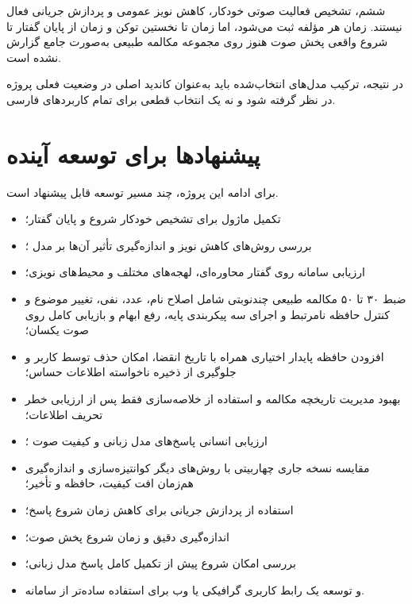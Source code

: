 ششم، تشخیص فعالیت صوتی خودکار، کاهش نویز عمومی و پردازش جریانی
فعال نیستند. زمان هر مؤلفه ثبت می‌شود، اما زمان تا نخستین توکن و
زمان از پایان گفتار تا شروع واقعی پخش صوت هنوز روی مجموعه مکالمه
طبیعی به‌صورت جامع گزارش نشده است.

در نتیجه، ترکیب مدل‌های انتخاب‌شده باید به‌عنوان کاندید
اصلی در وضعیت فعلی پروژه در نظر گرفته شود و نه یک انتخاب
قطعی برای تمام کاربردهای فارسی.


\section{پیشنهادها برای توسعه آینده}

برای ادامه این پروژه، چند مسیر توسعه قابل پیشنهاد است.

\begin{itemize}

    \item
    تکمیل ماژول
    برای تشخیص خودکار شروع و پایان گفتار؛

    \item
    بررسی روش‌های کاهش نویز و اندازه‌گیری تأثیر آن‌ها بر
    مدل ؛

    \item
    ارزیابی سامانه روی گفتار محاوره‌ای، لهجه‌های مختلف و
    محیط‌های نویزی؛

    \item
    ضبط ۳۰ تا ۵۰ مکالمه طبیعی چندنوبتی شامل اصلاح نام، عدد، نفی،
    تغییر موضوع و کنترل حافظه نامرتبط و اجرای سه پیکربندی پایه،
    رفع ابهام و بازیابی کامل روی صوت یکسان؛

    \item
    افزودن حافظه پایدار اختیاری همراه با تاریخ انقضا، امکان حذف
    توسط کاربر و جلوگیری از ذخیره ناخواسته اطلاعات حساس؛

    \item
    بهبود مدیریت تاریخچه مکالمه و استفاده از خلاصه‌سازی فقط پس
    از ارزیابی خطر تحریف اطلاعات؛

    \item
    ارزیابی انسانی پاسخ‌های مدل زبانی و کیفیت صوت ؛

    \item
    مقایسه نسخه جاری چهاربیتی با روش‌های دیگر کوانتیزه‌سازی و
    اندازه‌گیری هم‌زمان افت کیفیت، حافظه و تأخیر؛

    \item
    استفاده از پردازش جریانی برای کاهش زمان شروع پاسخ؛

    \item
    اندازه‌گیری دقیق
    و زمان شروع پخش صوت؛

    \item
    بررسی امکان شروع  پیش از تکمیل کامل پاسخ مدل زبانی؛

    \item
    و توسعه یک رابط کاربری گرافیکی یا وب برای استفاده
    ساده‌تر از سامانه.

\end{itemize}


